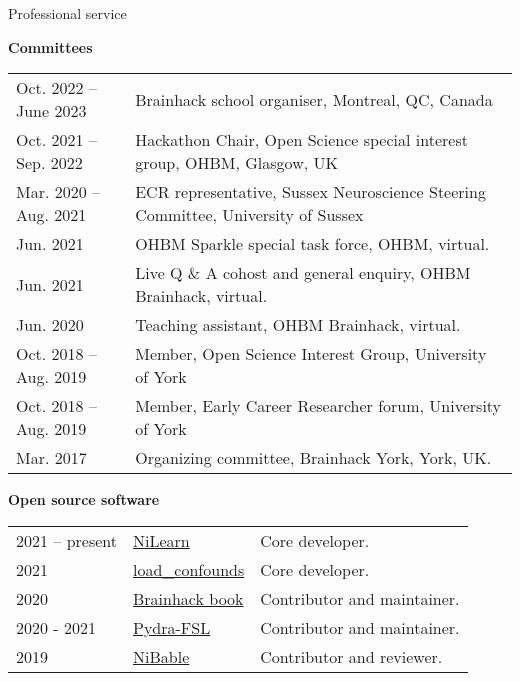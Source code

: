 \documentclass{resume} %
\begin{document}
\begin{rSection}{Professional service}

\textbf{Committees}

\begin{tabular}{@{} l l @{\hspace{6ex}}}
  Oct. 2022 -- June 2023 & Brainhack school organiser, Montreal, QC, Canada \\
  Oct. 2021 -- Sep. 2022 & Hackathon Chair, Open Science special interest group, OHBM, Glasgow, UK \\
  Mar. 2020 -- Aug. 2021 & ECR representative, Sussex Neuroscience Steering Committee, University of Sussex\\
  Jun. 2021 & OHBM Sparkle special task force, OHBM, virtual. \\
  Jun. 2021 & Live Q \& A cohost and general enquiry, OHBM Brainhack, virtual. \\
  Jun. 2020 & Teaching assistant, OHBM Brainhack, virtual. \\
  Oct. 2018 -- Aug. 2019 & Member, Open Science Interest Group, University of York\\
  Oct. 2018 -- Aug. 2019 & Member, Early Career Researcher forum, University of York\\
  Mar. 2017 & Organizing committee, Brainhack York, York, UK.\\
\end{tabular}

\textbf{Open source software}

\begin{tabular}{@{} l l l @{\hspace{6ex}}}
  2021 -- present & \href{https://github.com/nilearn/nilearn}{NiLearn} & Core developer.\\
  2021 & \href{https://github.com/SIMEXP/load_confounds}{load\_confounds} & Core developer.\\
  2020 & \href{https://github.com/brainhackorg/brainhack_jupyter_book}{Brainhack book} & Contributor and maintainer. \\
  2020 - 2021 & \href{https://github.com/nipype/pydra-fsl}{Pydra-FSL} & Contributor and maintainer. \\
  2019 & \href{https://github.com/nipy/nibabel/pull/793}{NiBable} & Contributor and reviewer.\\
\end{tabular}

\end{rSection}
\end{document}
